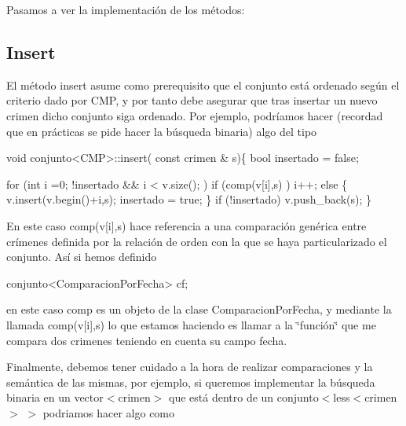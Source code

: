 Pasamos a ver la implementación de los métodos\-:\hypertarget{index_insert}{}\subsection{Insert}\label{index_insert}
El método insert asume como prerequisito que el conjunto está ordenado según el criterio dado por C\-M\-P, y por tanto debe asegurar que tras insertar un nuevo crimen dicho conjunto siga ordenado. Por ejemplo, podríamos hacer (recordad que en prácticas se pide hacer la búsqueda binaria) algo del tipo 
\begin{DoxyCode}
\textcolor{keywordtype}{void} conjunto<CMP>::insert( \textcolor{keyword}{const} crimen & s)\{
        \textcolor{keywordtype}{bool} insertado = \textcolor{keyword}{false};

        \textcolor{keywordflow}{for} (\textcolor{keywordtype}{int} i =0; !insertado && i < v.size(); )
            \textcolor{keywordflow}{if} (comp(v[i],s) ) i++;
            \textcolor{keywordflow}{else} \{
              v.insert(v.begin()+i,s);
              insertado = \textcolor{keyword}{true};
            \}
        \textcolor{keywordflow}{if} (!insertado) v.push\_back(s);
     \}
\end{DoxyCode}


En este caso comp(v\mbox{[}i\mbox{]},s) hace referencia a una comparación genérica entre crímenes definida por la relación de orden con la que se haya particularizado el conjunto. Así si hemos definido


\begin{DoxyCode}
conjunto<ComparacionPorFecha> cf;
\end{DoxyCode}


en este caso comp es un objeto de la clase Comparacion\-Por\-Fecha, y mediante la llamada comp(v\mbox{[}i\mbox{]},s) lo que estamos haciendo es llamar a la \char`\"{}función\char`\"{} que me compara dos crimenes teniendo en cuenta su campo fecha.

Finalmente, debemos tener cuidado a la hora de realizar comparaciones y la semántica de las mismas, por ejemplo, si queremos implementar la búsqueda binaria en un vector$<$crimen$>$ que está dentro de un conjunto$<$less$<$crimen$>$ $>$ podriamos hacer algo como


